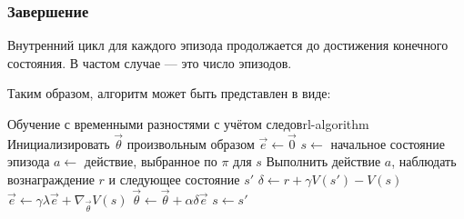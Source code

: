 \subsubsection{Завершение}
Внутренний цикл для каждого эпизода продолжается до достижения конечного состояния. В частом случае --- это число эпизодов.

Таким образом, алгоритм может быть представлен в виде:

\begin{alg}{Обучение с временными разностями с учётом следов}{rl-algorithm}
    \State Инициализировать $\vec{\theta}$ произвольным образом
        \State $\vec{e} \gets \vec{0}$
        \State $s \gets$ начальное состояние эпизода
            \State $a \gets$ действие, выбранное по $\pi$ для $s$
            \State Выполнить действие $a$, наблюдать вознаграждение $r$ и следующее состояние $s'$
            \State $\delta \gets r + \gamma V(s') - V(s)$
            \State $\vec{e} \gets \gamma \lambda \vec{e} + \nabla_{\vec{\theta}} V(s)$
            \State $\vec{\theta} \gets \vec{\theta} + \alpha \delta \vec{e}$
            \State $s \gets s'$
        \EndWhile
    \EndWhile
\end{alg}
